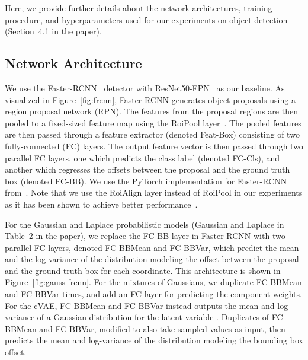 \documentclass[runningheads]{llncs}
\begin{document}
\begin{appendices}
Here, we provide further details about the network architectures, training procedure, and hyperparameters used for our experiments on object detection (Section~4.1 in the paper).




\subsection{Network Architecture}
We use the Faster-RCNN~\cite{Ren2015FasterRT} detector with ResNet50-FPN~\cite{lin2017feature} as our baseline. As visualized in Figure~\ref{fig:frcnn}, Faster-RCNN generates object proposals using a region proposal network (RPN). The features from the proposal regions are then pooled to a fixed-sized feature map using the RoiPool layer~\cite{Girshick2015FastR}. The pooled features are then passed through a feature extractor (denoted Feat-Box) consisting of two fully-connected (FC) layers. The output feature vector is then passed through two parallel FC layers, one which predicts the class label (denoted FC-Cls), and another which regresses the offsets between the proposal and the ground truth box (denoted FC-BB). We use the PyTorch implementation for Faster-RCNN from~\cite{massa2018mrcnn}. Note that we use the RoiAlign \cite{He2017MaskR} layer instead of RoiPool in our experiments as it has been shown to achieve better performance~\cite{He2017MaskR}.

For the Gaussian and Laplace probabilistic models (Gaussian and Laplace in Table~2 in the paper), we replace the FC-BB layer in Faster-RCNN with two parallel FC layers, denoted FC-BBMean and FC-BBVar, which predict the mean and the log-variance of the distribution modeling the offset between the proposal and the ground truth box for each coordinate. This architecture is shown in Figure~\ref{fig:gauss-frcnn}. For the mixtures of  Gaussians, we duplicate FC-BBMean and FC-BBVar  times, and add an FC layer for predicting the  component weights. For the cVAE, FC-BBMean and FC-BBVar instead outputs the mean and log-variance of a Gaussian distribution for the latent variable . Duplicates of FC-BBMean and FC-BBVar, modified to also take sampled  values as input, then predicts the mean and log-variance of the distribution modeling the bounding box offset.




\end{appendices}
\end{document}
